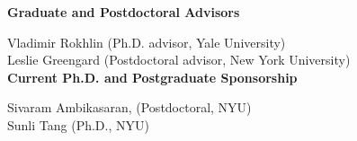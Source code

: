 \documentclass[letterpaper,12pt]{article}
\begin{document}
\noindent
{\bf Graduate and Postdoctoral Advisors}\par \noindent
Vladimir Rokhlin (Ph.D. advisor, Yale University)\\
Leslie Greengard (Postdoctoral advisor, New York University)\\

\noindent
{\bf Current Ph.D. and Postgraduate Sponsorship} \par \noindent
Sivaram Ambikasaran, (Postdoctoral, NYU)\\
Sunli Tang (Ph.D., NYU)\\
\end{document}
